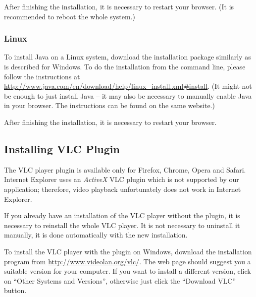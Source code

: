 After finishing the installation, it is necessary to restart your browser.
(It is recommended to reboot the whole system.)

\subsubsection{Linux}

To install Java on a Linux system, download the installation package similarly as is described for Windows. To do the installation from the command line, please follow the instructions at \url{http://www.java.com/en/download/help/linux_install.xml#install}. (It might not be enough to just install Java -- it may also be necessary to manually enable Java in your browser. The instructions can be found on the same website.)

After finishing the installation, it is necessary to restart your browser.

\subsection{Installing VLC Plugin}

The VLC player plugin is available only for Firefox, Chrome, Opera and Safari. Internet Explorer uses an \emph{ActiveX} VLC plugin which is not supported by our application; therefore, video playback unfortunately does not work in Internet Explorer.

If you already have an installation of the VLC player without the plugin, it is necessary to reinstall the whole VLC player. It is not necessary to uninstall it manually, it is done automatically with the new installation.

To install the VLC player with the plugin on Windows, download the installation program from \url{http://www.videolan.org/vlc/}. The web page should suggest you a suitable version for your computer. If you want to install a different version, click on ``Other Systems and Versions'', otherwise just click the ``Download VLC'' button.

